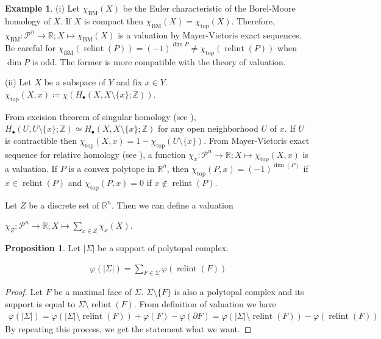 \documentclass[a4paper,dvipdfmx,reqno,12pt]{amsart}
\theoremstyle{definition}
\newtheorem{Eg}[Thm]{Example}
\newtheorem{Prop}[Thm]{Proposition}
\newcommand{\deq}{\coloneqq}
\newcommand{\R}{\mathbb{R}}%
\newcommand{\Z}{\mathbb{Z}}%
\newcommand{\opn}[1]{\operatorname{#1}}
\numberwithin{equation}{section}
\begin{document}
\begin{Eg}
  (i) Let $\chi_{\opn{BM}}(X)$ be the Euler characteristic of
  the Borel-Moore homology of $X$. If $X$ is compact
  then $\chi_{\opn{BM}}(X)=\chi_{\opn{top}}(X)$.
  Therefore,
  $\chi_{\opn{BM}}\colon\mathscr{P}^{n}\to \R ; X\mapsto \chi_{\opn{BM}}(X)$ is a valuation
  by Mayer-Vietoris exact sequences.
  Be careful for
  $\chi_{\opn{BM}}(\opn{relint}(P))=(-1)^{\dim P}
    \ne \chi_{\opn{top}}(\opn{relint}(P))$ when $\dim P$ is odd.
  The former is more compatible with the theory of valuation.

  (ii) Let $X$ be a subspace of $Y$ and fix $x\in Y$.
  $\chi_{\opn{top}}(X,x)\deq \chi(H_{\bullet}(X,X\setminus\{x\};\Z))$.

  From excision theorem of singular homology (see
  \cite[Theorem 2.20]{hatcherAlgebraicTopology2002a}),
  $H_{\bullet}(U,U\setminus\{x\};\Z)\simeq
    H_{\bullet}(X,X\setminus\{x\};\Z)$ for any open neighborhood $U$ of
  $x$. If $U$ is contractible then
  $\chi_{\opn{top}}(X,x)=1-\chi_{\opn{top}}(U\setminus \{x\})$.
  From Mayer-Vietoris exact sequence for relative homology
  (see \cite[p.152]{hatcherAlgebraicTopology2002a}), a function
  $\chi_x:\mathscr{P}^{n}\to \R;X\mapsto \chi_{\opn{top}}(X,x)$
  is a valuation.
  If $P$ is a convex polytope in $\R^{n}$, then
  $\chi_{\opn{top}}(P,x)=(-1)^{\dim (P)}$ if $x\in \opn{relint}(P)$
  and $\chi_{\opn{top}}(P,x)=0$ if $x\notin \opn{relint}(P)$.

  Let $Z$ be a discrete set of $\R^{n}$. Then we can define a valuation

  $\chi_{Z}:\mathscr{P}^{n}\to \R; X\mapsto \sum_{x\in Z}\chi_{x}(X)$.
\end{Eg}


\begin{Prop}
  Let $|\Sigma|$ be a support of polytopal complex.

  \begin{align}
    \varphi(|\Sigma|)=\sum_{F\in \Sigma}\varphi(\opn{relint}(F))
  \end{align}

\end{Prop}
\begin{proof}
  Let $F$ be a maximal face of $\Sigma$.
  $\Sigma \setminus\{F\}$ is also a polytopal complex and its support
  is equal to $\Sigma \setminus \opn{relint}(F)$. From
  definition of valuation we have
  \begin{align}
    \varphi(|\Sigma|)=\varphi(|\Sigma|\setminus \opn{relint}(F))
    +\varphi(F)-\varphi(\partial F)
    =\varphi(|\Sigma|\setminus \opn{relint}(F))
    -\varphi(\opn{relint}(F))
  \end{align}
  By repeating this process, we get the statement what we want.
\end{proof}
\end{document}
